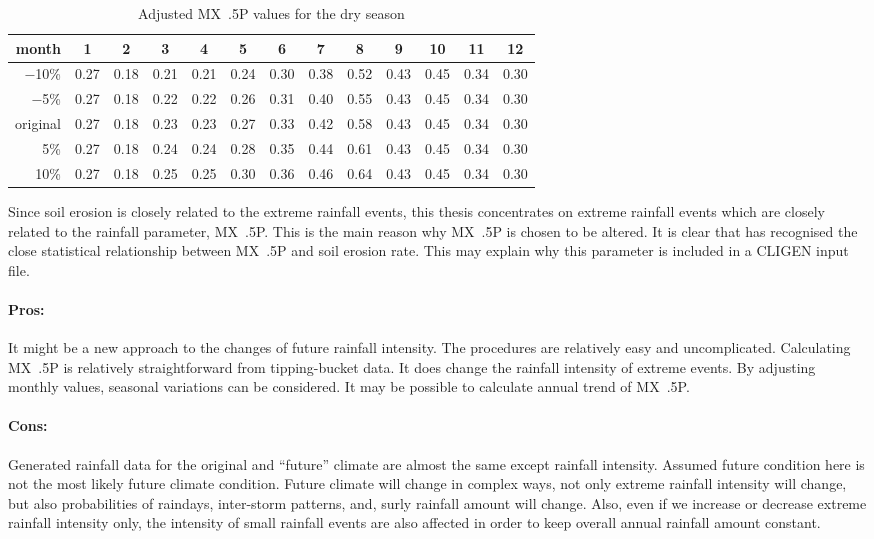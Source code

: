 \begin{table}[htbp]
  \centering
  \footnotesize
  \caption{Adjusted MX~.5P values for the dry season}
  \label{tab:AdjustedMX5Pvaluesfordryseasons}
    \begin{tabular}{r|cc|cccccc|cccc}
      \toprule
      month & 1 &2& \textbf{3} &\textbf{4} &\textbf{5}& \textbf{6}& \textbf{7}&
\textbf{8}& 9 &10& 11& 12\\
      \midrule
      $-$10\%  &0.27&  0.18  &0.21 & 0.21 & 0.24 & 0.30 & 0.38 & 0.52 & 0.43 &
0.45 & 0.34&  0.30\\
      $-$5\% & 0.27 & 0.18 & 0.22  &0.22  &0.26  &0.31 & 0.40& 0.55 & 0.43 &
0.45 & 0.34 & 0.30\\
      original&  0.27  &0.18 & 0.23  &0.23 & 0.27 & 0.33 &0.42  &0.58 & 0.43&
0.45 & 0.34 & 0.30\\
      5\%  &0.27 & 0.18&  0.24& 0.24 & 0.28 & 0.35 & 0.44 &0.61 & 0.43 & 0.45 &
0.34 & 0.30\\
      10\% & 0.27  &0.18 & 0.25  &0.25  &0.30  &0.36 & 0.46& 0.64 & 0.43 &0.45
&0.34  &0.30 \\
      \bottomrule
    \end{tabular}
\end{table}

Since soil erosion is closely related to the extreme rainfall events, this
thesis concentrates on extreme rainfall events which are closely related to the
rainfall parameter, MX~.5P. This is the main reason why MX~.5P is chosen to be
altered. It is clear that \citet{nicks1995-2} has recognised the close
statistical relationship between MX~.5P and soil erosion rate. This may explain
why this parameter is included in a CLIGEN input file.

\paragraph{Pros:}
\label{sec:ProsMethodTwo}
It might be a new approach to the changes of future rainfall intensity. The
procedures are relatively easy and uncomplicated. Calculating MX~.5P is
relatively straightforward from tipping-bucket data. It does change the rainfall
intensity of extreme events. By adjusting monthly values, seasonal variations
can be considered. It may be possible to calculate annual trend of MX~.5P.

\paragraph{Cons:}
\label{sec:ConsMethodTwo}
Generated rainfall data for the original and ``future'' climate are almost the
same except rainfall intensity. Assumed future condition here is not the most
likely future climate condition. Future climate will change in complex ways, not
only extreme rainfall intensity will change, but also probabilities of raindays,
inter-storm patterns, and, surly rainfall amount will change. Also, even if we
increase or decrease extreme rainfall intensity only, the intensity of small
rainfall events are also affected in order to keep overall annual rainfall
amount constant.

